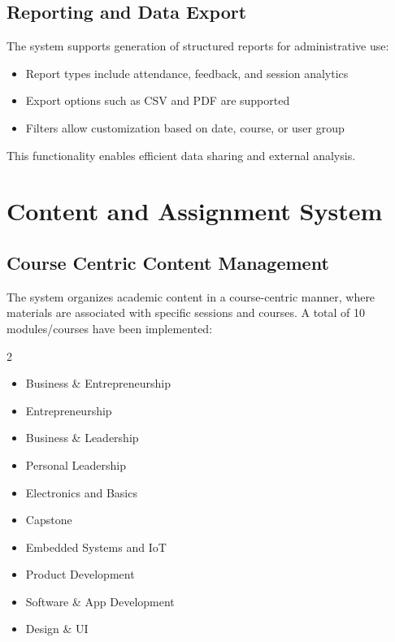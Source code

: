 \subsection{Reporting and Data Export}

The system supports generation of structured reports for administrative use:

\begin{itemize}
    \item Report types include attendance, feedback, and session analytics
    \item Export options such as CSV and PDF are supported
    \item Filters allow customization based on date, course, or user group
\end{itemize}

This functionality enables efficient data sharing and external analysis.

\section{Content and Assignment System}

\subsection{Course Centric Content Management}

The system organizes academic content in a course-centric manner, where materials are associated
with specific sessions and courses. A total of 10 modules/courses have been implemented:

\begin{multicols}{2}
\begin{itemize}
    \item Business \& Entrepreneurship
    \item Entrepreneurship
    \item Business \& Leadership
    \item Personal Leadership
    \item Electronics and Basics
    \item Capstone
    \item Embedded Systems and IoT
    \item Product Development
    \item Software \& App Development
    \item Design \& UI
\end{itemize}
\end{multicols}

